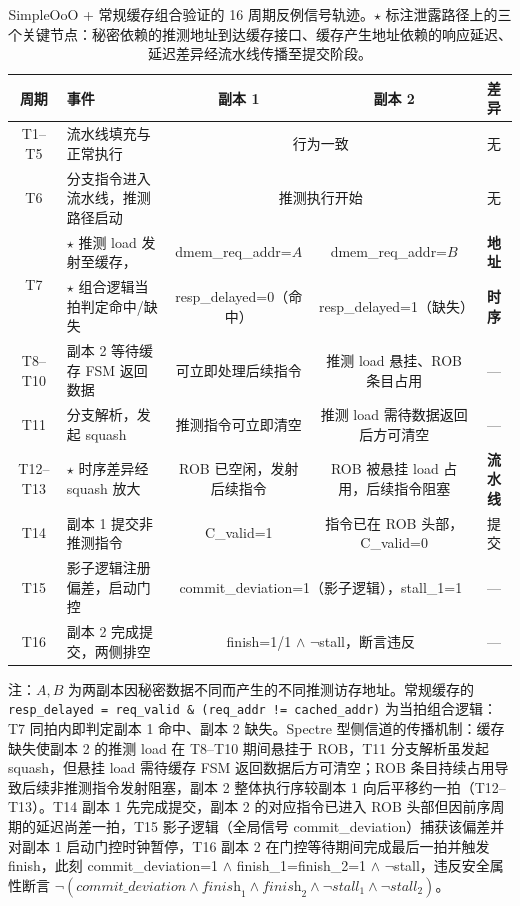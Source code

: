 
\begin{table}[htb]
    \centering
    \caption{SimpleOoO + 常规缓存组合验证的 16 周期反例信号轨迹。$\star$ 标注泄露路径上的三个关键节点：秘密依赖的推测地址到达缓存接口、缓存产生地址依赖的响应延迟、延迟差异经流水线传播至提交阶段。}
    \label{tab:ch5_cex_signals}
    \small
    \begin{tabular}{clccc}
        \hline
        \textbf{周期} & \textbf{事件} & \textbf{副本 1} & \textbf{副本 2} & \textbf{差异} \\
        \hline
        T1--T5 & 流水线填充与正常执行 & \multicolumn{2}{c}{行为一致} & 无 \\
        T6 & 分支指令进入流水线，推测路径启动 & \multicolumn{2}{c}{推测执行开始} & 无 \\
        \hline
        \multirow{2}{*}{T7} & $\star$ 推测 load 发射至缓存， & dmem\_req\_addr=$A$ & dmem\_req\_addr=$B$ & \textbf{地址} \\
              & $\star$ 组合逻辑当拍判定命中/缺失 & resp\_delayed=0（命中） & resp\_delayed=1（缺失） & \textbf{时序} \\
        T8--T10 & 副本 2 等待缓存 FSM 返回数据 & 可立即处理后续指令 & 推测 load 悬挂、ROB 条目占用 & — \\
        \hline
        T11 & 分支解析，发起 squash & 推测指令可立即清空 & 推测 load 需待数据返回后方可清空 & — \\
        T12--T13 & $\star$ 时序差异经 squash 放大 & ROB 已空闲，发射后续指令 & ROB 被悬挂 load 占用，后续指令阻塞 & \textbf{流水线} \\
        T14 & 副本 1 提交非推测指令 & C\_valid=1 & 指令已在 ROB 头部，C\_valid=0 & 提交 \\
        T15 & 影子逻辑注册偏差，启动门控 & \multicolumn{2}{c}{commit\_deviation=1（影子逻辑），stall\_1=1} & — \\
        T16 & 副本 2 完成提交，两侧排空 & \multicolumn{2}{c}{finish=1/1 $\wedge$ $\neg$stall，断言违反} & — \\
        \hline
    \end{tabular}
    \begin{flushleft}
    \small 注：$A, B$ 为两副本因秘密数据不同而产生的不同推测访存地址。常规缓存的 \texttt{resp\_delayed = req\_valid \& (req\_addr != cached\_addr)} 为当拍组合逻辑：T7 同拍内即判定副本 1 命中、副本 2 缺失。Spectre 型侧信道的传播机制：缓存缺失使副本 2 的推测 load 在 T8--T10 期间悬挂于 ROB，T11 分支解析虽发起 squash，但悬挂 load 需待缓存 FSM 返回数据后方可清空；ROB 条目持续占用导致后续非推测指令发射阻塞，副本 2 整体执行序较副本 1 向后平移约一拍（T12--T13）。T14 副本 1 先完成提交，副本 2 的对应指令已进入 ROB 头部但因前序周期的延迟尚差一拍，T15 影子逻辑（全局信号 commit\_deviation）捕获该偏差并对副本 1 启动门控时钟暂停，T16 副本 2 在门控等待期间完成最后一拍并触发 finish，此刻 commit\_deviation=1 $\wedge$ finish\_1=finish\_2=1 $\wedge$ $\neg$stall，违反安全属性断言 $\neg(\textit{commit\_deviation} \wedge \textit{finish}_1 \wedge \textit{finish}_2 \wedge \neg \textit{stall}_1 \wedge \neg \textit{stall}_2)$。

\end{flushleft}
\end{table}
